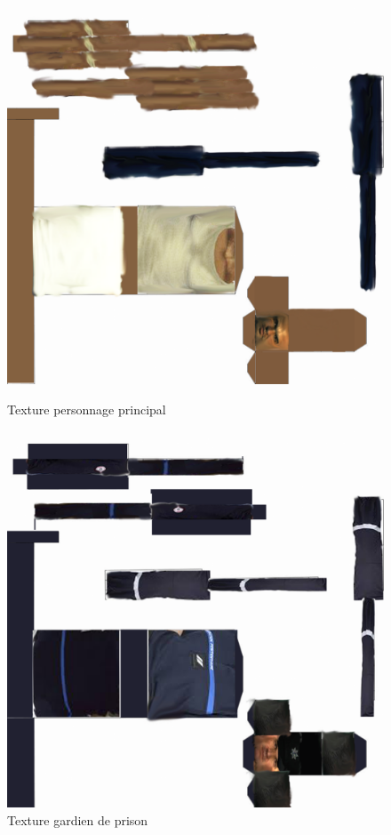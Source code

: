 \documentclass{article}
\begin{document}
\begin{figure}[htbp]
\begin{minipage}[c]{.45\linewidth}
\begin{center}
\includegraphics[scale=2]{michaelphotoshop.png}
\caption{Texture personnage principal}
\label{fig:michaelphotoshop}
\end{center}
\end{minipage}
\hfill
\begin{minipage}[c]{.45\linewidth}
\begin{center}
\includegraphics[scale=2]{bellikphotoshop.png}
\caption{Texture gardien de prison}
\label{fig:bellikphotoshop}
\end{center}
\end{minipage}
\end{figure}
\end{document}
